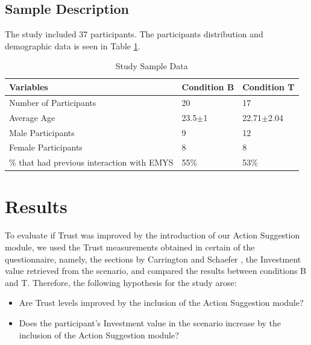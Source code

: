 \subsection{Sample Description}
The study included 37 participants. The participants distribution and demographic data is seen in Table \ref{tbl:SampleData}.

\begin{table}[h]
    \centering
    \begin{tabular}{|l|l|l|}
        \hline
        \textbf{Variables}                              &  \textbf{Condition B}     & \textbf{Condition T}  \\ \hline
        Number of Participants                          &  20                       & 17                    \\ \hline
        Average Age                                     &  23.5$\pm$1               & 22.71$\pm$2.04        \\ \hline
        Male Participants                               &  9                        & 12           \\ \hline
        Female Participants                             &  8                        & 8             \\ \hline
        \% that had previous interaction with EMYS      &  55\%                     & 53\%          \\ \hline
    \end{tabular}
    \caption{Study Sample Data}
    \label{tbl:SampleData}
\end{table}

\section{Results}
To evaluate if Trust was improved by the introduction of our Action Suggestion module, we used the Trust measurements obtained in certain of the questionnaire, namely, the sections by Carrington \cite{Carrington2007} and Schaefer \cite{Schaefer2009}, the Investment value retrieved from the scenario, and compared the results between conditions B and T. Therefore, the following hypothesis for the study arose:

\begin{itemize}
    \item Are Trust levels improved by the inclusion of the Action Suggestion module?
    \item Does the participant's Investment value in the scenario increase by the inclusion of the Action Suggestion module?
\end{itemize}

